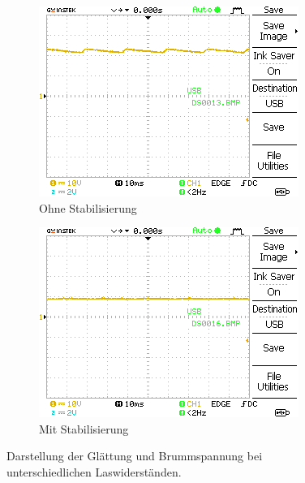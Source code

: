\documentclass{article}
\theoremstyle{definition}
\begin{document}
\begin{figure}[h!]
\begin{subfigure}[b]{0.45\textwidth}
    \end{subfigure}

    \vspace{0.5cm} %

    \begin{subfigure}[b]{0.45\textwidth}
        \includegraphics[width=\textwidth]{MesswerteVersuch2/DS0013.png}
          \caption{Ohne Stabilisierung}
    \end{subfigure}
    \hfill
    \begin{subfigure}[b]{0.45\textwidth}
        \includegraphics[width=\textwidth]{MesswerteVersuch2/DS0016.png}
        \caption{Mit Stabilisierung}
    \end{subfigure}


    \caption{Darstellung der Glättung und Brummspannung bei unterschiedlichen Laswiderständen.}
    \label{fig:StabBrumm}
\end{figure}
\end{document}
